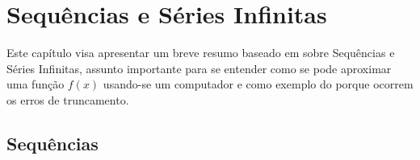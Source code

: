 \chapter{Sequências e Séries Infinitas}

    Este capítulo visa apresentar um breve resumo baseado em \cite{stewart} sobre Sequências e Séries Infinitas, assunto importante para se entender como se pode aproximar uma função $f(x)$ usando-se um computador e como exemplo do porque ocorrem os erros de truncamento.
    

	\section{Sequências}
	
